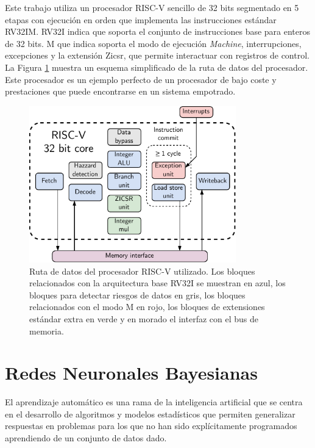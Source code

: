 Este trabajo utiliza un procesador RISC-V sencillo de 32 bits segmentado en 5 etapas con ejecución en orden que implementa las instrucciones estándar RV32IM. RV32I indica que soporta el conjunto de instrucciones base para enteros de 32 bits. M que indica soporta el modo de ejecución \textit{Machine}, interrupciones, excepciones y la extensión Zicsr, que permite interactuar con registros de control. La Figura \ref{fig:riscv_data_pipeline} muestra un esquema simplificado de la ruta de datos del procesador. Este procesador es un ejemplo perfecto de un procesador de bajo coste y prestaciones que puede encontrarse en un sistema empotrado.

\begin{figure}[htb]
    \centering
    \includegraphics[width=0.8\textwidth]{root/Imagenes/3_estado_arte/riscv_core.pdf}
    \caption{Ruta de datos del procesador RISC-V utilizado. Los bloques relacionados con la arquitectura base RV32I se muestran en azul, los bloques para detectar riesgos de datos en gris, los bloques relacionados con el modo M en rojo, los bloques de extensiones estándar extra en verde y en morado el interfaz con el bus de memoria.}
    \label{fig:riscv_data_pipeline}
\end{figure}

\section{Redes Neuronales Bayesianas}

El aprendizaje automático es una rama de la inteligencia artificial que se centra en el desarrollo de algoritmos y modelos estadísticos que permiten generalizar respuestas en problemas para los que no han sido explícitamente programados aprendiendo de un conjunto de datos dado.

